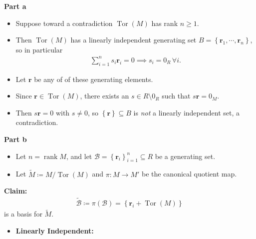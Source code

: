 \begin{solution}

\textbf{Part a}

\begin{itemize}
\tightlist
\item
  Suppose toward a contradiction \(\operatorname{Tor}(M)\) has rank
  \(n \geq 1\).
\item
  Then \(\operatorname{Tor}(M)\) has a linearly independent generating
  set \(B = \left\{{\mathbf{r}_1, \cdots, \mathbf{r}_n}\right\}\), so in
  particular
  \begin{align*}  
  \sum_{i=1}^n s_i \mathbf{r}_i = 0 \implies s_i = 0_R \,\forall i
  .\end{align*}
\item
  Let \(\mathbf{r}\) be any of of these generating elements.
\item
  Since \(\mathbf{r}\in \operatorname{Tor}(M)\), there exists an
  \(s\in R\setminus 0_R\) such that \(s\mathbf{r} = 0_M\).
\item
  Then \(s\mathbf{r} = 0\) with \(s\neq 0\), so
  \(\left\{{\mathbf{r}}\right\} \subseteq B\) is \emph{not} a linearly
  independent set, a contradiction.
\end{itemize}

\textbf{Part b}

\begin{itemize}
\tightlist
\item
  Let \(n = \operatorname{rank}M\), and let
  \(\mathcal B = \left\{{\mathbf{r}_i}\right\}_{i=1}^n \subseteq R\) be
  a generating set.
\item
  Let \(\tilde M \coloneqq M/\operatorname{Tor}(M)\) and
  \(\pi: M \to M'\) be the canonical quotient map.
\end{itemize}

\textbf{Claim:}
\begin{align*}
\tilde {\mathcal{B}}\coloneqq\pi(\mathcal B) = \left\{{\mathbf{r}_i + \operatorname{Tor}(M)}\right\}
\end{align*}
is a basis for \(\tilde M\).

\begin{itemize}
\item
  \textbf{Linearly Independent:}


\end{itemize}
\end{solution}
